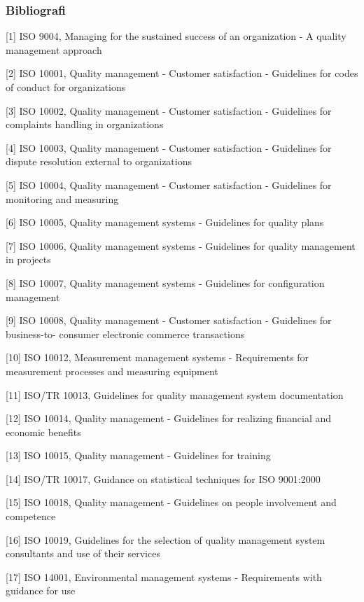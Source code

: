 \documentclass[
]{article}
\begin{document}
\hypertarget{bibliografi}{%
\subsubsection{Bibliografi}\label{bibliografi}}

{[}1{]} ISO 9004, Managing for the sustained success of an organization
- A quality management approach

{[}2{]} ISO 10001, Quality management - Customer satisfaction -
Guidelines for codes of conduct for organizations

{[}3{]} ISO 10002, Quality management - Customer satisfaction -
Guidelines for complaints handling in organizations

{[}4{]} ISO 10003, Quality management - Customer satisfaction -
Guidelines for dispute resolution external to organizations

{[}5{]} ISO 10004, Quality management - Customer satisfaction -
Guidelines for monitoring and measuring

{[}6{]} ISO 10005, Quality management systems - Guidelines for quality
plans

{[}7{]} ISO 10006, Quality management systems - Guidelines for quality
management in projects

{[}8{]} ISO 10007, Quality management systems - Guidelines for
configuration management

{[}9{]} ISO 10008, Quality management - Customer satisfaction -
Guidelines for business-to- consumer electronic commerce transactions

{[}10{]} ISO 10012, Measurement management systems - Requirements for
measurement processes and measuring equipment

{[}11{]} ISO/TR 10013, Guidelines for quality management system
documentation

{[}12{]} ISO 10014, Quality management - Guidelines for realizing
financial and economic benefits

{[}13{]} ISO 10015, Quality management - Guidelines for training

{[}14{]} ISO/TR 10017, Guidance on statistical techniques for ISO
9001:2000

{[}15{]} ISO 10018, Quality management - Guidelines on people
involvement and competence

{[}16{]} ISO 10019, Guidelines for the selection of quality management
system consultants and use of their services

{[}17{]} ISO 14001, Environmental management systems - Requirements with
guidance for use
\end{document}

